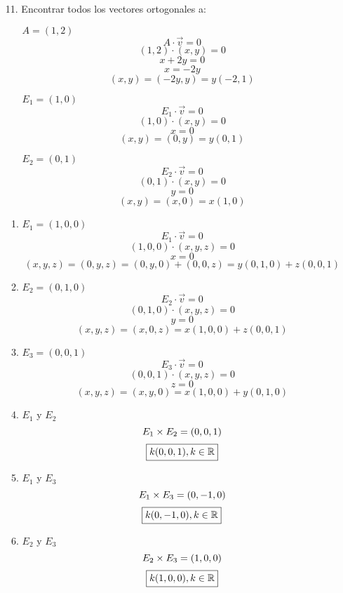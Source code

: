 \documentclass[../practica.root.tex]{subfiles}
\begin{document}
\begin{enumerate}
\begin{enumerate}
    \end{enumerate} 
    \item[11.] Encontrar todos los vectores ortogonales a:
    \begin{enumerate}
        \item[\textcolor{red}{\blacksquare}] $ A = (1,2) $
        \[ A\cdot\vec{v} = 0 \]
        \[ (1, 2)\cdot(x, y) = 0 \]
        \[ x + 2y = 0 \]
        \[ x = -2y \]
        \[ (x, y) = (-2y, y) = \boxed{y(-2,1)} \]
        \item[\textcolor{green}{\blacksquare}] $ E_1 = (1,0) $
        \[ E_1\cdot\vec{v} = 0 \]
        \[ (1, 0)\cdot(x, y) = 0 \]
        \[ x = 0 \]
        \[ (x, y) = (0, y) = \boxed{y(0, 1)} \]
        \item[\textcolor{blue}{\blacksquare}] $ E_2 = (0,1) $
        \[ E_2\cdot\vec{v} = 0 \]
        \[ (0, 1)\cdot(x, y) = 0 \]
        \[ y = 0 \]
        \[ (x, y) = (x, 0) = \boxed{x(1, 0)} \]
    \end{enumerate}
    \begin{enumerate}
        \item $ E_1 = (1,0,0) $
        \[ E_1\cdot\vec{v} = 0 \]
        \[ (1,0,0)\cdot(x,y,z) = 0 \]
        \[ x = 0 \]
        \[ (x,y,z) = (0,y,z) = (0,y,0) + (0,0,z) = \boxed{y(0,1,0) + z(0,0,1)} \]
        \item $ E_2 = (0,1,0) $
        \[ E_2\cdot\vec{v} = 0 \]
        \[ (0,1,0)\cdot(x,y,z) = 0 \]
        \[ y = 0 \]
        \[ (x,y,z) = (x,0,z) = \boxed{x(1,0,0) + z(0,0,1)} \]
        \item $ E_3 = (0,0,1) $
        \[ E_3\cdot\vec{v} = 0 \]
        \[ (0,0,1)\cdot(x,y,z) = 0 \]
        \[ z = 0 \]
        \[ (x,y,z) = (x,y,0) = \boxed{x(1,0,0) + y(0,1,0)} \]
        \item $E_1$ y $E_2$
        \[ E_1\times E_2 = (0,0,1) \]
        \[ \boxed{k(0,0,1), k \in \mathbb{R}} \]
        \item $E_1$ y $E_3$
        \[ E_1\times E_3 = (0,-1,0) \]
        \[ \boxed{k(0,-1,0), k \in \mathbb{R}} \]
        \item $E_2$ y $E_3$
        \[ E_2\times E_3 = (1,0,0) \]
        \[ \boxed{k(1,0,0), k \in \mathbb{R}} \]
    \end{enumerate}
    \item[] 
\end{enumerate}
\end{document}
